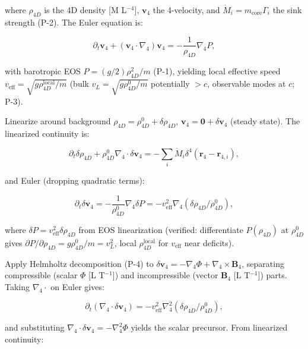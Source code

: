 where $\rho_{4D}$ is the 4D density [M L$^{-4}$], $\mathbf{v}_4$ the 4-velocity, and $\dot{M}_i = m_{\text{core}} \Gamma_i$ the sink strength (P-2). The Euler equation is:

\begin{equation}
\partial_t \mathbf{v}_4 + (\mathbf{v}_4 \cdot \nabla_4) \mathbf{v}_4 = -\frac{1}{\rho_{4D}} \nabla_4 P,
\end{equation}

with barotropic EOS $P = (g/2) \rho_{4D}^2 / m$ (P-1), yielding local effective speed $v_{\text{eff}} = \sqrt{g \rho_{4D}^{\text{local}} / m}$ (bulk $v_L = \sqrt{g \rho_{4D}^0 / m}$ potentially $>c$, observable modes at $c$; P-3).

Linearize around background $\rho_{4D} = \rho_{4D}^0 + \delta \rho_{4D}$, $\mathbf{v}_4 = \mathbf{0} + \delta \mathbf{v}_4$ (steady state). The linearized continuity is:

\begin{equation}
\partial_t \delta \rho_{4D} + \rho_{4D}^0 \nabla_4 \cdot \delta \mathbf{v}_4 = -\sum_i \dot{M}_i \delta^4(\mathbf{r}_4 - \mathbf{r}_{4,i}),
\end{equation}

and Euler (dropping quadratic terms):

\begin{equation}
\partial_t \delta \mathbf{v}_4 = -\frac{1}{\rho_{4D}^0} \nabla_4 \delta P = -v_{\text{eff}}^2 \nabla_4 (\delta \rho_{4D} / \rho_{4D}^0),
\end{equation}

where $\delta P = v_{\text{eff}}^2 \delta \rho_{4D}$ from EOS linearization (verified: differentiate $P(\rho_{4D})$ at $\rho_{4D}^0$ gives $\partial P / \partial \rho_{4D} = g \rho_{4D}^0 / m = v_L^2$, local $\rho_{4D}^{\text{local}}$ for $v_{\text{eff}}$ near deficits).

Apply Helmholtz decomposition (P-4) to $\delta \mathbf{v}_4 = -\nabla_4 \Phi + \nabla_4 \times \mathbf{B}_4$, separating compressible (scalar $\Phi$ [L T$^{-1}$]) and incompressible (vector $\mathbf{B}_4$ [L T$^{-1}$]) parts. Taking $\nabla_4 \cdot$ on Euler gives:

\begin{equation}
\partial_t (\nabla_4 \cdot \delta \mathbf{v}_4) = -v_{\text{eff}}^2 \nabla_4^2 (\delta \rho_{4D} / \rho_{4D}^0),
\end{equation}

and substituting $\nabla_4 \cdot \delta \mathbf{v}_4 = -\nabla_4^2 \Phi$ yields the scalar precursor. From linearized continuity:


